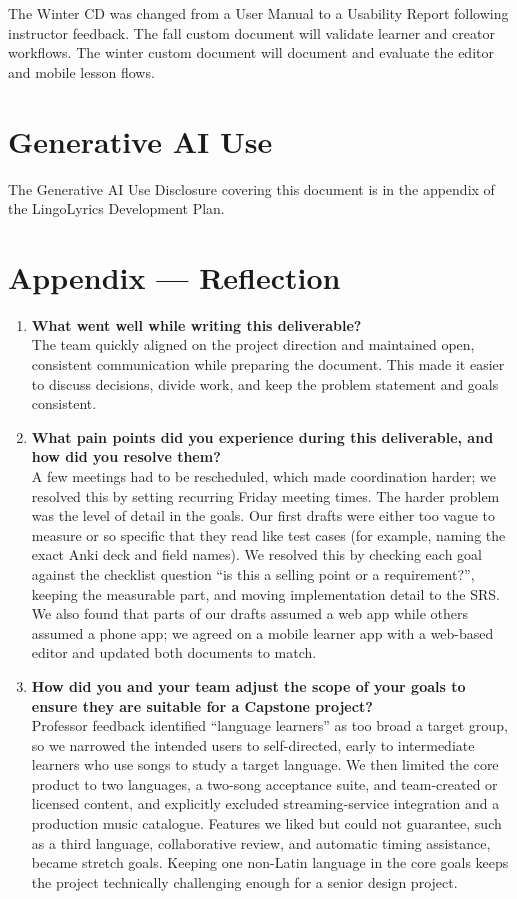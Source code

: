 \documentclass{article}
\renewcommand{\progname}{LingoLyrics}
\begin{document}
The Winter CD was changed from a User Manual to a Usability Report following
instructor feedback. The fall custom document will validate learner and creator workflows. The
winter custom document will document and evaluate the editor and mobile lesson
flows.

\section*{Generative AI Use}
The Generative AI Use Disclosure covering this document is in the appendix of
the \progname{} Development Plan.

\newpage{}

\section*{Appendix --- Reflection}
\begin{enumerate}
  \item \textbf{What went well while writing this deliverable?}\\
  The team quickly aligned on the project direction and maintained open,
  consistent communication while preparing the document. This made it easier to
  discuss decisions, divide work, and keep the problem statement and goals
  consistent.

  \item \textbf{What pain points did you experience during this deliverable,
  and how did you resolve them?}\\
  A few meetings had to be rescheduled, which made coordination harder; we
  resolved this by setting recurring Friday meeting times. The harder problem
  was the level of detail in the goals. Our first drafts were either too vague
  to measure or so specific that they read like test cases (for example, naming
  the exact Anki deck and field names). We resolved this by checking each goal
  against the checklist question ``is this a selling point or a requirement?'',
  keeping the measurable part, and moving implementation detail to the SRS. We
  also found that parts of our drafts assumed a web app while others assumed a
  phone app; we agreed on a mobile learner app with a web-based editor and
  updated both documents to match.

  \item \textbf{How did you and your team adjust the scope of your goals to
  ensure they are suitable for a Capstone project?}\\
  Professor feedback identified ``language learners'' as too broad a target
  group, so we narrowed the intended users to self-directed, early
  to intermediate learners who use songs to study a target language. We then
  limited the core product to two languages, a two-song acceptance suite, and
  team-created or licensed content, and explicitly excluded streaming-service
  integration and a production music catalogue. Features we liked but could not
  guarantee, such as a third language, collaborative review, and automatic
  timing assistance, became stretch goals. Keeping one non-Latin language in
  the core goals keeps the project technically challenging enough for a senior
  design project.
\end{enumerate}
\end{document}
